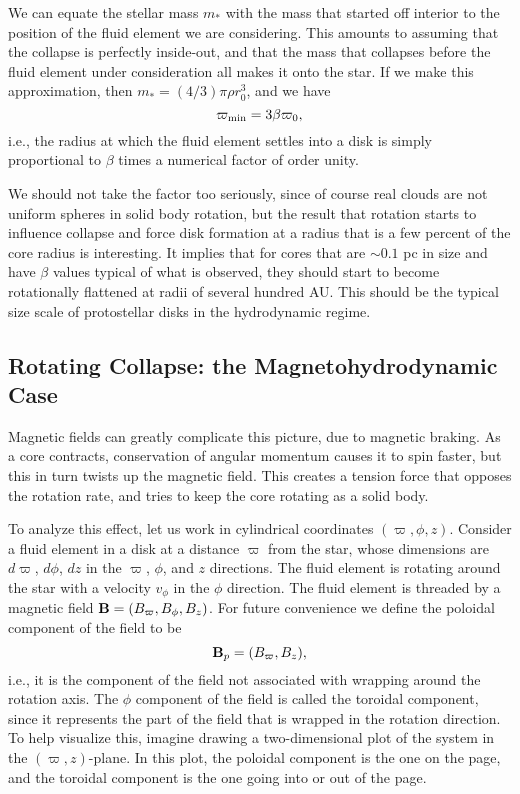 We can equate the stellar mass $m_*$ with the mass that started off interior to the position of the fluid element we are considering. This amounts to assuming that the collapse is perfectly inside-out, and that the mass that collapses before the fluid element under consideration all makes it onto the star. If we make this approximation, then $m_*=(4/3)\pi \rho r_0^3$, and we have
\begin{equation}
\varpi_{\rm min} = 3 \beta \varpi_0,
\end{equation}
i.e., the radius at which the fluid element settles into a disk is simply proportional to $\beta$ times a numerical factor of order unity.

We should not take the factor too seriously, since of course real clouds are not uniform spheres in solid body rotation, but the result that rotation starts to influence collapse and force disk formation at a radius that is a few percent of the core radius is interesting. It implies that for cores that are $\sim 0.1$ pc in size and have $\beta$ values typical of what is observed, they should start to become rotationally flattened at radii of several hundred AU. This should be the typical size scale of protostellar disks in the hydrodynamic regime.

\subsection{Rotating Collapse: the Magnetohydrodynamic Case}

Magnetic fields can greatly complicate this picture, due to magnetic braking. As a core contracts, conservation of angular momentum causes it to spin faster, but this in turn twists up the magnetic field. This creates a tension force that opposes the rotation rate, and tries to keep the core rotating as a solid body.

To analyze this effect, let us work in cylindrical coordinates $(\varpi, \phi, z)$. Consider a fluid element in a disk at a distance $\varpi$ from the star, whose dimensions are $d\varpi$, $d\phi$, $dz$ in the $\varpi$, $\phi$, and $z$ directions. The fluid element is rotating around the star with a velocity $v_{\phi}$ in the $\phi$ direction. The fluid element is threaded by a magnetic field $\mathbf{B}=(B_\varpi, B_\phi, B_z)$. For future convenience we define the poloidal component of the field to be
\begin{equation}
\mathbf{B}_p = (B_\varpi, B_z),
\end{equation}
i.e., it is the component of the field not associated with wrapping around the rotation axis. The $\phi$ component of the field is called the toroidal component, since it represents the part of the field that is wrapped in the rotation direction. To help visualize this, imagine drawing a two-dimensional plot of the system in the $(\varpi, z)$-plane. In this plot, the poloidal component is the one on the page, and the toroidal component is the one going into or out of the page.

